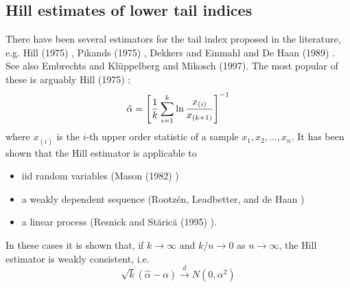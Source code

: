 \documentclass{article}
\begin{document}
\subsection{Hill estimates of lower tail indices}
\label{sec:Hill}
There have been several estimators for the tail index proposed in the
literature, e.g. Hill (1975) \cite{hill1975simple}, Pikands (1975)
\cite{pickands1975statistical}, Dekkers and Einmahl and De Haan (1989)
\cite{dekkers1989moment}. See also Embrechts and Kl\"uppelberg and
Mikosch (1997)\cite{Embrechts1997}. The most popular of these is
arguably Hill (1975) \cite{hill1975simple}:
\begin{equation}
  \label{eq:Hill_index}
  \hat \alpha = \left[
    {1 \over k} \sum_{i=1}^k \ln {x_{(i)} \over x_{(k+1)}}
    \right]^{-1}
\end{equation}
where $x_{(i)}$ is the $i$-th upper order statistic of a sample
$x_1, x_2, ..., x_n$. It has been shown that the Hill estimator is
applicable to 
\begin{itemize}
\item iid random variables (Mason (1982) \cite{mason1982laws})
\item a weakly dependent sequence (Rootz{\'e}n, Leadbetter,
  and de Haan \cite{rootzen1992tail})
\item a linear process (Resnick and St{\u{a}}ric{\u{a}} (1995)
  \cite{resnick1995consistency}).
\end{itemize}
In these cases it is shown that, if $k \to \infty$ and $k/n \to 0$
as $n \to \infty$, the Hill estimator is weakly consistent, i.e.
\[
\sqrt k (\hat \alpha - \alpha) \overset{d}{\to} N(0, \alpha^2)
\]
\end{document}
